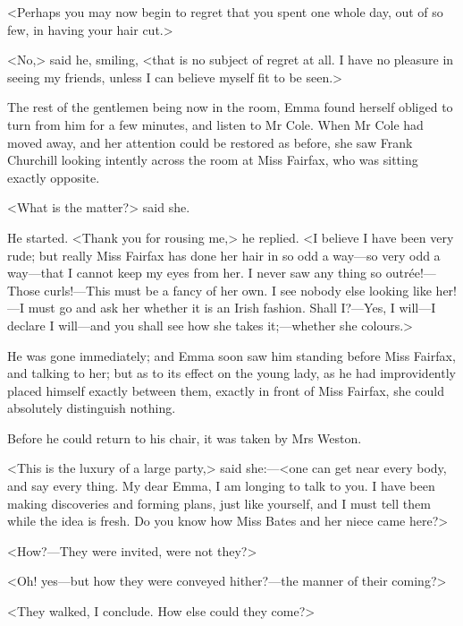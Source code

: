 <Perhaps you may now begin to regret that you spent one whole day, out of so few, in having your hair cut.>

<No,> said he, smiling, <that is no subject of regret at all. I have no pleasure in seeing my friends, unless I can believe myself fit to be seen.>

The rest of the gentlemen being now in the room, Emma found herself obliged to turn from him for a few minutes, and listen to Mr Cole. When Mr Cole had moved away, and her attention could be restored as before, she saw Frank Churchill looking intently across the room at Miss Fairfax, who was sitting exactly opposite.

<What is the matter?> said she.

He started. <Thank you for rousing me,> he replied. <I believe I have been very rude; but really Miss Fairfax has done her hair in so odd a way—so very odd a way—that I cannot keep my eyes from her. I never saw any thing so outrée!—Those curls!—This must be a fancy of her own. I see nobody else looking like her!—I must go and ask her whether it is an Irish fashion. Shall I\@?—Yes, I will—I declare I will—and you shall see how she takes it;—whether she colours.>

He was gone immediately; and Emma soon saw him standing before Miss Fairfax, and talking to her; but as to its effect on the young lady, as he had improvidently placed himself exactly between them, exactly in front of Miss Fairfax, she could absolutely distinguish nothing.

Before he could return to his chair, it was taken by Mrs Weston.

<This is the luxury of a large party,> said she:—<one can get near every body, and say every thing. My dear Emma, I am longing to talk to you. I have been making discoveries and forming plans, just like yourself, and I must tell them while the idea is fresh. Do you know how Miss Bates and her niece came here?>

<How?—They were invited, were not they?>

<Oh! yes—but how they were conveyed hither?—the manner of their coming?>

<They walked, I conclude. How else could they come?>

